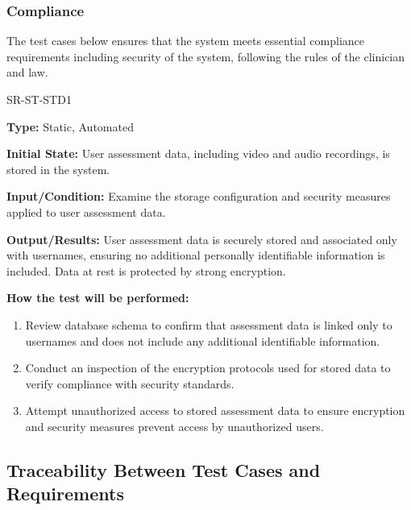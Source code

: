 \documentclass[12pt, titlepage]{article}
\begin{document}
\subsubsection{Compliance}

The test cases below ensures that the system meets essential 
compliance requirements including security of the system, following the rules of the clinician and law.
		
\begin{itemize}
  \begin{item}
    SR-ST-STD1
    \begin{mdframed}[linewidth=0.5mm]
      \textbf{Type:} Static, Automated \par
      \textbf{Initial State:} User assessment data, including video and audio recordings, is stored in the system. \par
      \textbf{Input/Condition:} Examine the storage configuration and security measures applied to user assessment data. \par
      \textbf{Output/Results:} User assessment data is securely stored and associated only with usernames, ensuring no additional personally identifiable information is included. Data at rest is protected by strong encryption. \par
      \textbf{How the test will be performed:}
      \begin{enumerate}[noitemsep]
        \item Review database schema to confirm that assessment data is linked only to usernames and does not include any additional identifiable information.
        \item Conduct an inspection of the encryption protocols used for stored data to verify compliance with security standards.
        \item Attempt unauthorized access to stored assessment data to ensure encryption and security measures prevent access by unauthorized users.
      \end{enumerate}
    \end{mdframed}
  \end{item}

\end{itemize}


\subsection{Traceability Between Test Cases and Requirements}

\end{document}
